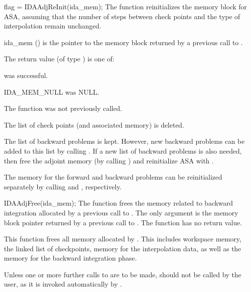 {
  flag = IDAAdjReInit(ida\_mem);
}
{
  The function  reinitializes the {\idas} memory
  block for ASA, assuming that the number of steps between check
  points and the type of interpolation remain unchanged.
}
{
  \begin{args}
  \item[ida\_mem] ()
    is the pointer to the {\idas} memory block returned by a previous call to
    .
  \end{args}
}
{
   The return value  (of type ) is one of:
   \begin{args}
   \item[\Id{IDA\_SUCCESS}]
      was successful.
   \item[IDA\_MEM\_NULL]
      was NULL.
   \item[\Id{IDA\_NO\_ADJ}]
     The function  was not previously called.
   \end{args}
}
{
  The list of check points (and associated memory) is deleted.

  The list of backward problems is kept. However, new backward problems can
  be added to this list by calling . If a new list of backward
  problems is also needed, then free the adjoint memory (by calling
  ) and reinitialize ASA with .

  The {\idas} memory for the forward and backward problems can be reinitialized
  separately by calling  and , respectively.
}



{
  IDAAdjFree(ida\_mem);
}
{
  The function  frees the memory related to backward integration
  allocated by a previous call to .
}
{
  The only argument is the {\idas} memory block pointer returned by a previous call
  to .
}
{
  The function  has no return value.
}
{
  This function frees all memory allocated by . This
  includes workspace memory, the linked list of checkpoints, memory
  for the interpolation data, as well as the {\idas} memory for the
  backward integration phase.

  Unless one or more further calls to  are to be made,
   should not be called by the user, as it is invoked
  automatically by .
}


